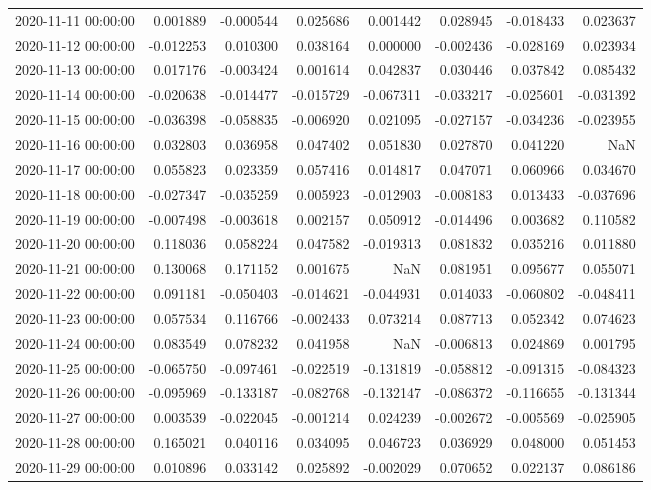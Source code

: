 \begin{tabular}{lrrrrrrr}
2020-11-11 00:00:00 & 0.001889 & -0.000544 & 0.025686 & 0.001442 & 0.028945 & -0.018433 & 0.023637 \\
2020-11-12 00:00:00 & -0.012253 & 0.010300 & 0.038164 & 0.000000 & -0.002436 & -0.028169 & 0.023934 \\
2020-11-13 00:00:00 & 0.017176 & -0.003424 & 0.001614 & 0.042837 & 0.030446 & 0.037842 & 0.085432 \\
2020-11-14 00:00:00 & -0.020638 & -0.014477 & -0.015729 & -0.067311 & -0.033217 & -0.025601 & -0.031392 \\
2020-11-15 00:00:00 & -0.036398 & -0.058835 & -0.006920 & 0.021095 & -0.027157 & -0.034236 & -0.023955 \\
2020-11-16 00:00:00 & 0.032803 & 0.036958 & 0.047402 & 0.051830 & 0.027870 & 0.041220 & NaN \\
2020-11-17 00:00:00 & 0.055823 & 0.023359 & 0.057416 & 0.014817 & 0.047071 & 0.060966 & 0.034670 \\
2020-11-18 00:00:00 & -0.027347 & -0.035259 & 0.005923 & -0.012903 & -0.008183 & 0.013433 & -0.037696 \\
2020-11-19 00:00:00 & -0.007498 & -0.003618 & 0.002157 & 0.050912 & -0.014496 & 0.003682 & 0.110582 \\
2020-11-20 00:00:00 & 0.118036 & 0.058224 & 0.047582 & -0.019313 & 0.081832 & 0.035216 & 0.011880 \\
2020-11-21 00:00:00 & 0.130068 & 0.171152 & 0.001675 & NaN & 0.081951 & 0.095677 & 0.055071 \\
2020-11-22 00:00:00 & 0.091181 & -0.050403 & -0.014621 & -0.044931 & 0.014033 & -0.060802 & -0.048411 \\
2020-11-23 00:00:00 & 0.057534 & 0.116766 & -0.002433 & 0.073214 & 0.087713 & 0.052342 & 0.074623 \\
2020-11-24 00:00:00 & 0.083549 & 0.078232 & 0.041958 & NaN & -0.006813 & 0.024869 & 0.001795 \\
2020-11-25 00:00:00 & -0.065750 & -0.097461 & -0.022519 & -0.131819 & -0.058812 & -0.091315 & -0.084323 \\
2020-11-26 00:00:00 & -0.095969 & -0.133187 & -0.082768 & -0.132147 & -0.086372 & -0.116655 & -0.131344 \\
2020-11-27 00:00:00 & 0.003539 & -0.022045 & -0.001214 & 0.024239 & -0.002672 & -0.005569 & -0.025905 \\
2020-11-28 00:00:00 & 0.165021 & 0.040116 & 0.034095 & 0.046723 & 0.036929 & 0.048000 & 0.051453 \\
2020-11-29 00:00:00 & 0.010896 & 0.033142 & 0.025892 & -0.002029 & 0.070652 & 0.022137 & 0.086186 \\

\end{tabular}

